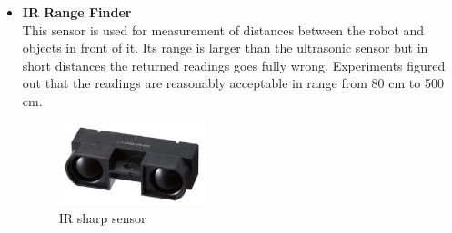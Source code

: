 \documentclass[12pt]{book}
\begin{document}
\begin{itemize}
	\item \textbf{IR Range Finder}\\
	This sensor is used for measurement of distances between the robot and objects in front of it. Its range is larger than the ultrasonic sensor but in short distances the returned readings goes fully wrong. Experiments figured out that the readings are reasonably acceptable in range from 80 cm to 500 cm.
	\begin{figure}
		\centering
		\includegraphics[width =0.4\textwidth]{Fig/Electronics/ir.jpg}
		\caption{IR sharp sensor}
		\label{fig:ir}
	\end{figure}
\end{itemize}
\end{document}
